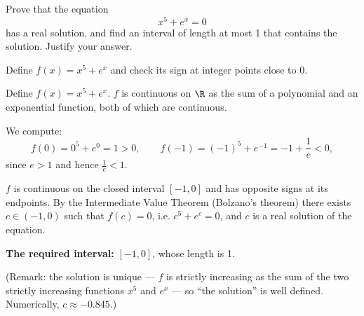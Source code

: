 
\begin{question}
Prove that the equation
\[
x^5+e^x=0
\]
has a real solution, and find an interval of length at most 1 that contains the solution. Justify your answer.
\end{question}

\begin{hint}
Define $f(x)=x^5+e^x$ and check its sign at integer points close to 0.
\end{hint}

\begin{solution}
Define $f(x)=x^5+e^x$. $f$ is continuous on $\R$ as the sum of a polynomial and an exponential function, both of which are continuous.

We compute:
\[
f(0)=0^5+e^0=1>0,\qquad f(-1)=(-1)^5+e^{-1}=-1+\frac1e<0 ,
\]
since $e>1$ and hence $\frac1e<1$.

$f$ is continuous on the closed interval $[-1,0]$ and has opposite signs at its endpoints. By the Intermediate Value Theorem (Bolzano's theorem) there exists $c\in(-1,0)$ such that $f(c)=0$, i.e. $c^5+e^c=0$, and $c$ is a real solution of the equation.

\textbf{The required interval:} $[-1,0]$, whose length is 1.

(Remark: the solution is unique --- $f$ is strictly increasing as the sum of the two strictly increasing functions $x^5$ and $e^x$ --- so ``the solution'' is well defined. Numerically, $c\approx-0.845$.)
\end{solution}
